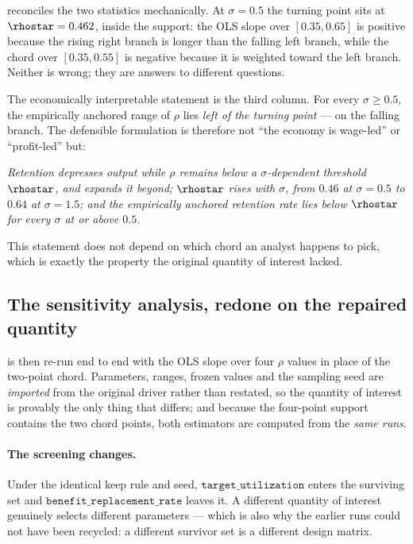  reconciles the two statistics mechanically. At
$\sigma = 0.5$ the turning point sits at $\rhostar = 0.462$, inside the
support: the OLS slope over $[0.35, 0.65]$ is positive because the rising
right branch is longer than the falling left branch, while the chord over
$[0.35, 0.55]$ is negative because it is weighted toward the left branch.
Neither is wrong; they are answers to different questions.

The economically interpretable statement is the third column. For every
$\sigma \geq 0.5$, the empirically anchored range of $\rho$ lies \emph{left of
the turning point} --- on the falling branch. The defensible formulation is
therefore not ``the economy is wage-led'' or ``profit-led'' but:

\begin{declbox}
\emph{Retention depresses output while $\rho$ remains below a
$\sigma$-dependent threshold $\rhostar$, and expands it beyond;
$\rhostar$ rises with $\sigma$, from $0.46$ at $\sigma = 0.5$ to $0.64$ at
$\sigma = 1.5$; and the empirically anchored retention rate lies below
$\rhostar$ for every $\sigma$ at or above $0.5$.}
\end{declbox}

This statement does not depend on which chord an analyst happens to pick, which
is exactly the property the original quantity of interest lacked.

\subsection{The sensitivity analysis, redone on the repaired quantity}
\label{sec:sarepaired}

 is then re-run end to end with the OLS slope over four $\rho$
values in place of the two-point chord. Parameters, ranges, frozen values and
the sampling seed are \emph{imported} from the original driver rather than
restated, so the quantity of interest is provably the only thing that differs;
and because the four-point support contains the two chord points, both
estimators are computed from the \emph{same runs}.

\paragraph{The screening changes.} Under the identical keep rule and seed,
$\mathtt{target\_utilization}$ enters the surviving set and
$\mathtt{benefit\_replacement\_rate}$ leaves it. A different quantity of
interest genuinely selects different parameters --- which is also why the
earlier runs could not have been recycled: a different survivor set is a
different design matrix.

